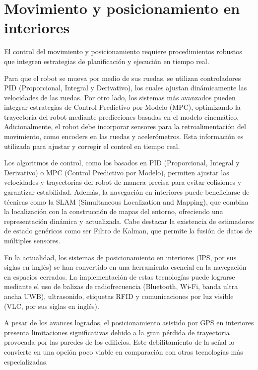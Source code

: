 \section{Movimiento y posicionamiento en interiores}

El control del movimiento y posicionamiento requiere procedimientos robustos que integren estrategias de planificación y ejecución en tiempo real.

Para que el robot se mueva por medio de sus ruedas, se utilizan controladores PID (Proporcional, Integral y Derivativo), los cuales ajustan dinámicamente las velocidades de las ruedas. Por otro lado, los sistemas más avanzados pueden integrar estrategias de Control Predictivo por Modelo (MPC), optimizando la trayectoria del robot mediante predicciones basadas en el modelo cinemático. Adicionalmente, el robot debe incorporar sensores para la retroalimentación del movimiento, como encoders en las ruedas y acelerómetros. Esta información es utilizada para ajustar y corregir el control en tiempo real.

Los algoritmos de control, como los basados en PID (Proporcional, Integral y Derivativo) o MPC (Control Predictivo por Modelo), permiten ajustar las velocidades y trayectorias del robot de manera precisa para evitar colisiones y garantizar estabilidad. Además, la navegación en interiores puede beneficiarse de técnicas como la SLAM (Simultaneous Localization and Mapping), que combina la localización con la construcción de mapas del entorno, ofreciendo una representación dinámica y actualizada. Cabe destacar la existencia de estimadores de estado genéricos como ser Filtro de Kalman, que permite la fusión de datos de múltiples sensores.

En la actualidad, los sistemas de posicionamiento en interiores (IPS, por sus siglas en inglés) se han convertido en una herramienta esencial en la navegación en espacios cerrados. La implementación de estas tecnologías puede lograrse mediante el uso de balizas de radiofrecuencia (Bluetooth, Wi-Fi, banda ultra ancha UWB), ultrasonido, etiquetas RFID y comunicaciones por luz visible (VLC, por sus siglas en inglés). \cite{nuaimisurveyindoorpositioning}

A pesar de los avances logrados, el posicionamiento asistido por GPS en interiores presenta limitaciones significativas debido a la gran pérdida de trayectoria provocada por las paredes de los edificios. Este debilitamiento de la señal lo convierte en una opción poco viable en comparación con otras tecnologías más especializadas.

